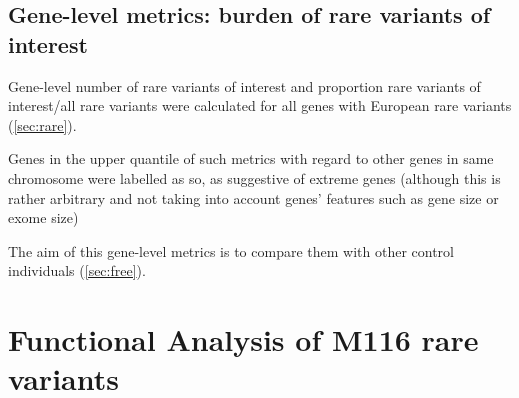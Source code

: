 \documentclass{article}\usepackage[]{graphicx}\usepackage[dvipsnames]{xcolor}
\begin{document}


\subsection{Gene-level metrics: burden of rare variants of interest}
\label{sec:genes}

Gene-level number of rare variants of interest and proportion rare variants of interest/all rare variants were calculated for all genes with European rare variants (\autoref{sec:rare}).

Genes in the upper quantile of such metrics with regard to other genes in same chromosome were labelled as so, as suggestive of extreme genes (although this is rather arbitrary and not taking into account genes' features such as gene size or exome size)

The aim of this gene-level metrics is to compare them with other control individuals (\autoref{sec:free}).





\section{Functional Analysis of M116 rare variants}
\label{sec:fun}
\end{document}
